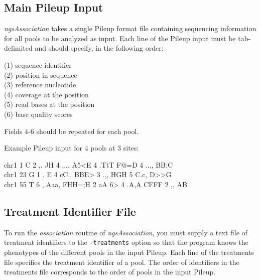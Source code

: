 \documentclass[12pt]{article}
\newenvironment{codeblock}{ \begin{framed}\ttfamily}{ \end{framed} }
\begin{document}
\subsection{Main Pileup Input}

\label{pileup}

\textit{ngsAssociation} takes a single Pileup format file containing sequencing information for all pools to be analyzed as input. Each line of the Pileup input must be tab-delimited and should specify, in the following order:

\vspace{5mm}

(1) sequence identifier\\
(2) position in sequence\\
(3) reference nucleotide\\
(4) coverage at the position\\
(5) read bases at the position\\
(6) base quality scores

\vspace{5mm}

Fields 4-6 should be repeated for each pool.

\vspace{5mm}

Example Pileup input for 4 pools at 3 sites:
\vspace{-0.5cm}
\begin{codeblock}
chr1	1	C	2	,.	JH	4	,...		A5<E	4	.TtT		F@=D	4	..,,	BB:C\\
chr1	23	G	1	.	E	4	cC..		BBE>	3	.,,		HGH	5	C.c,	D>>G\\
chr1	55	T	6	,.Aaa,	FHH=;H	2	aA		6>	4	.A,A		CFFF	2	,,	AB
\end{codeblock}

\subsection{Treatment Identifier File}

\label{treatfile}

To run the {\it association} routine of \textit{ngsAssociation}, you must supply a text file of treatment identifiers to the \texttt{-treatments} option so that the program knows the phenotypes of the different pools in the input Pileup. Each line of the treatments file specifies the treatment identifier of a pool. The order of identifiers in the treatments file corresponds to the order of pools in the input Pileup.

\vspace{5mm}
\end{document}
